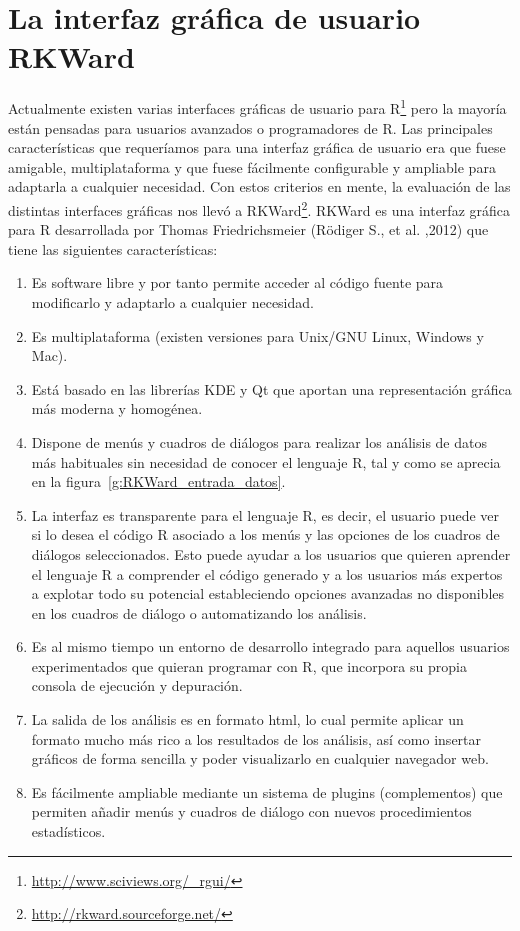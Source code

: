 \documentclass[10pt,twoside,spanish]{article}
\numberwithin{equation}{section}
\begin{document}
\section{La interfaz gráfica de usuario RKWard}
Actualmente existen varias interfaces gráficas de usuario para R\footnote{\url{http://www.sciviews.org/_rgui/}} pero la mayoría están
pensadas para usuarios avanzados o programadores de R.
Las principales características que requeríamos para una interfaz gráfica de usuario era que fuese amigable, multiplataforma y que fuese
fácilmente configurable y ampliable para adaptarla a cualquier necesidad.
Con estos criterios en mente, la evaluación de las distintas interfaces gráficas nos llevó a
RKWard\footnote{\url{http://rkward.sourceforge.net/}}.
RKWard es una interfaz gráfica para R desarrollada por Thomas Friedrichsmeier (Rödiger S., et al. ,2012)
que tiene las siguientes características:
\begin{enumerate}
\item Es software libre y por tanto permite acceder al código fuente para modificarlo y adaptarlo a cualquier necesidad. 
\item Es multiplataforma (existen versiones para Unix/GNU Linux, Windows y Mac).
\item Está basado en las librerías KDE y Qt que aportan una representación gráfica más moderna y homogénea.
\item Dispone de menús y cuadros de diálogos para realizar los análisis de datos más habituales sin necesidad de conocer
el lenguaje R, tal y como se aprecia en la figura~\ref{g:RKWard_entrada_datos}.
\item La interfaz es transparente para el lenguaje R, es decir, el usuario puede ver si lo desea el código R asociado a los
menús y las opciones de los cuadros de diálogos seleccionados.
Esto puede ayudar a los usuarios que quieren aprender el lenguaje R a comprender
el código generado y a los usuarios más expertos a explotar todo su potencial estableciendo opciones avanzadas no disponibles en los cuadros
de diálogo o automatizando los análisis.
\item Es al mismo tiempo un entorno de desarrollo integrado para aquellos usuarios experimentados que quieran programar con R, que incorpora
su propia consola de ejecución y depuración. 
\item La salida de los análisis es en formato html, lo cual permite aplicar un formato mucho más rico a los resultados de los análisis, así
como insertar gráficos de forma sencilla y poder visualizarlo en cualquier navegador web. 
\item Es fácilmente ampliable mediante un sistema de plugins (complementos) que permiten añadir menús y cuadros de
diálogo con nuevos procedimientos estadísticos. 
\end{enumerate}
\end{document}
